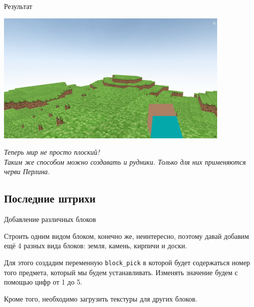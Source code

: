 \documentclass[handout]{beamer}
\begin{document}
    \begin{frame}{Результат}
        \begin{center}
            \includegraphics[width=0.85\textwidth]{img/8.png} \\
            \begin{justify}
                \textit{Теперь мир не просто плоский! \\ Таким же способом можно создавать и рудники. Только для них применяются черви Перлина.}
            \end{justify}
        \end{center}
    \end{frame}


    \subsection{Последние штрихи}
    \begin{frame}{Добавление различных блоков}
        \begin{justify}        
            Строить одним видом блоком, конечно же, неинтересно, поэтому давай добавим ещё 4 разных вида блоков: земля, камень, кирпичи и доски.
    
            Для этого создадим переменную \texttt{block\_pick} в которой будет содержаться номер того предмета, который мы будем устанавливать. Изменять значение будем с помощью цифр от 1 до 5.
    
            Кроме того, необходимо загрузить текстуры для других блоков.
        \end{justify}  
    \end{frame}
\end{document}
